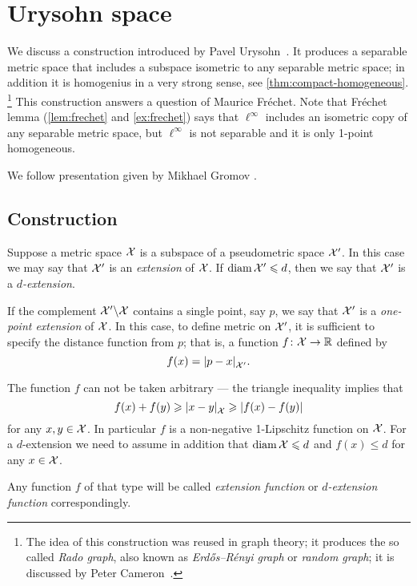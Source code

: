 \chapter{Urysohn space}

We discuss a construction introduced by Pavel Urysohn~\cite{urysohn}.
It produces a separable metric space that includes a subspace  isometric to any separable metric space; in addition it is homogenius in a very strong sense, see \ref{thm:compact-homogeneous}.%
\footnote{The idea of this construction was reused in graph theory; it produces the so called \emph{Rado graph},
also known as \emph{Erd\H{o}s–R\'enyi graph} or \emph{random graph}; it is discussed by Peter Cameron~\cite{cameron}.}
This construction answers a question of Maurice Fréchet.
Note that Fréchet lemma (\ref{lem:frechet} and \ref{ex:frechet}) says that $\ell^\infty$ includes an isometric copy of any separable metric space, but $\ell^\infty$ is not separable and it is only 1-point homogeneous.

We follow presentation given by Mikhael Gromov \cite{gromov-2007}.






\section{Construction}
Suppose a metric space $\mathcal{X}$ is a subspace of a pseudometric space $\mathcal{X}'$.
In this case we may say that $\mathcal{X}'$ is an \emph{extension} of $\mathcal{X}$.
If $\operatorname{\rm diam}\nolimits\mathcal{X}'\leqslant d$, then we say that $\mathcal{X}'$ is a \emph{$d$-extension}.

If the complement $\mathcal{X}'\backslash \mathcal{X}$ contains a single point, say $p$, we say that $\mathcal{X}'$ is a \emph{one-point extension} of $\mathcal{X}$.
In this case, to define metric on $\mathcal{X}'$, it is sufficient to specify the distance function from $p$; that is, a function $f\colon\mathcal{X}\to\mathbb{R}$ defined by 
\[f(x)=\dist{p}{x}{\spc{X}'}.\]

The function $f$ can not be taken arbitrary --- the triangle inequality implies that 
\[f(x)+f(y)\ge \dist{x}{y}{\spc{X}}\ge |f(x)-f(y)|\]
for any $x,y\in \mathcal{X}$.
In particular $f$ is a non-negative 1-Lipschitz function on $\mathcal{X}$.
For a $d$-extension we need to assume in addition that $\diam\spc{X}\z\le d$ and $f(x)\le d$ for any $x\in \mathcal{X}$.

Any function $f$ of that type will be called \emph{extension function}\label{page:extension function} or \emph{$d$-extension function} correspondingly.

